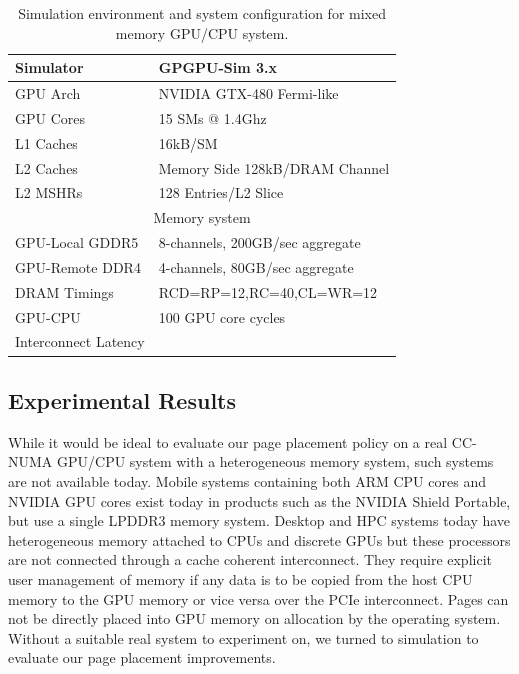 \begin{table}[t]
\begin{center}
\begin{tabular}{|l|l|}
\hline
Simulator & GPGPU-Sim 3.x\\
\hline
GPU Arch & NVIDIA GTX-480 Fermi-like\\
\hline
GPU Cores& 15 {\color{black}SMs} @ 1.4Ghz\\
\hline
L1 Caches & 16kB/SM \\
\hline
L2 Caches & Memory Side 128kB/DRAM Channel\\
\hline
L2 MSHRs & 128 Entries/L2 Slice\\
\hline
\hline
\multicolumn{2}{|c|}{Memory system}\\
\hline
GPU-Local GDDR5 & 8-channels, 200GB/sec aggregate\\
\hline
GPU-Remote DDR4& 4-channels, 80GB/sec aggregate\\
\hline
DRAM Timings & \multicolumn{1}{|l|}{RCD=RP=12,RC=40,CL=WR=12}\\
\hline
GPU-CPU &  100 GPU core cycles\\
Interconnect Latency & \\
\hline
\end{tabular}
\caption{Simulation environment and system configuration for mixed memory GPU/CPU system.}
\label{tab:methodology}
\end{center}
\vspace{-0.15in}
\end{table}

\subsection{Experimental Results}

While it would be ideal to evaluate our page placement policy on a real CC-NUMA
GPU/CPU system with a heterogeneous memory system, such systems are not available today.
Mobile systems containing both ARM CPU cores and NVIDIA GPU cores exist today in products
such as the NVIDIA Shield Portable, but use a single LPDDR3 memory system.
Desktop and HPC systems today have heterogeneous memory attached to CPUs and discrete
GPUs but these processors are not connected through a cache coherent interconnect.  They require explicit user 
management of memory if any data is to be copied from the host CPU memory to the GPU memory or vice versa
over the PCIe interconnect. Pages can not be directly placed into GPU memory on allocation by the operating system.
Without a suitable real system to experiment on, we turned to simulation to evaluate our
page placement improvements.

